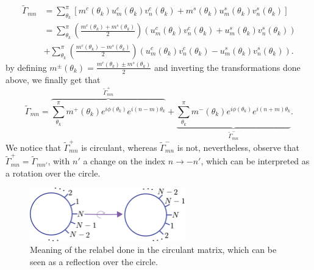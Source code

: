 \begin{equation}
\begin{aligned}
\tilde{\Gamma}_{m n} &=\sum_{\theta_{k}}^{\pi}\left[m^{c}\left(\theta_{k}\right) u_{m}^{c}\left(\theta_{k}\right) v_{n}^{c}\left(\theta_{k}\right)+m^{s}\left(\theta_{k}\right) u_{m}^{s}\left(\theta_{k}\right) v_{n}^{s}\left(\theta_{k}\right)\right] \\
&=\sum_{\theta_{k}}^{\pi}\left(\frac{m^{c}\left(\theta_{k}\right)+m^{s}\left(\theta_{k}\right)}{2}\right)\left(u_{m}^{c}\left(\theta_{k}\right) v_{n}^{c}\left(\theta_{k}\right)+u_{m}^{s}\left(\theta_{k}\right) v_{n}^{s}\left(\theta_{k}\right)\right) \\
&+\sum_{\theta_{k}}^{\pi}\left(\frac{m^{c}\left(\theta_{k}\right)-m^{s}\left(\theta_{k}\right)}{2}\right)\left(u_{m}^{c}\left(\theta_{k}\right) v_{n}^{c}\left(\theta_{k}\right)-u_{m}^{s}\left(\theta_{k}\right) v_{n}^{s}\left(\theta_{k}\right)\right).
\end{aligned}
\end{equation}
by defining $m^{\pm}\left(\theta_{k}\right)=\frac{m^{c}\left(\theta_{k}\right) \pm m^{s}\left(\theta_{k}\right)}{2}$ and inverting the transformations done above, we finally get that
\begin{equation}
\tilde{\Gamma}_{m n}=\overbrace{\sum_{\theta_{k}}^{\pi} m^{+}\left(\theta_{k}\right) e^{i \phi\left(\theta_{k}\right)} e^{i(n-m) \theta_{k}}}^{\tilde{\Gamma}^{+}_{mn}}+\underbrace{\sum_{\theta_{k}}^{\pi} m^{-}\left(\theta_{k}\right) e^{i \phi\left(\theta_{k}\right)} e^{i(n+m) \theta_{k}}}_{\tilde{\Gamma}_{m n}^{-}}.
\end{equation}
We notice that $\tilde{\Gamma}^{+}_{mn}$ is circulant, whereas $\tilde{\Gamma}^{-}_{mn}$ is not, nevertheless, observe that $\tilde{\Gamma}^{+}_{mn} = \tilde{\Gamma}^{}_{mn'}$, with $n'$ a change on the index $n\to -n'$, which can be interpreted as a rotation over the circle.
\begin{figure}[H]
    \centering
    \includegraphics[width=0.6\textwidth]{Figures/Reflection_over_circle.png}
    \caption{Meaning of the relabel done in the circulant matrix, which can be seen as a reflection over the circle.}
    \label{reflectioncircle}
\end{figure}
